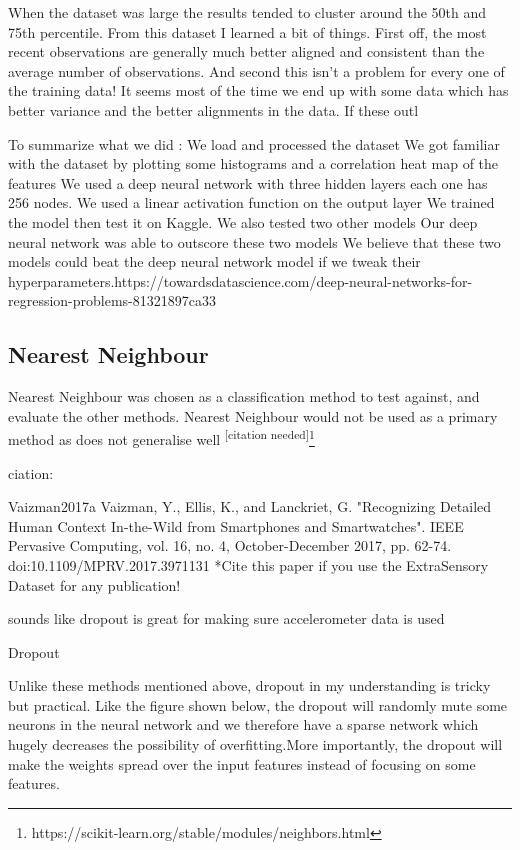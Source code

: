 \documentclass{UoNMCHA}
\newcommand{\citationneeded}{\textsuperscript{\color{blue} [citation needed]}}
\numberwithin{equation}{section}
\begin{document}
When the dataset was large the results tended to cluster around the 50th and 75th percentile. From this dataset I learned a bit of things. First off, the most recent observations are generally much better aligned and consistent than the average number of observations. And second this isn't a problem for every one of the training data! It seems most of the time we end up with some data which has better variance and the better alignments in the data. If these outl





To summarize what we did :
We load and processed the dataset
We got familiar with the dataset by plotting some histograms and a correlation heat map of the features
We used a deep neural network with three hidden layers each one has 256 nodes.
We used a linear activation function on the output layer
We trained the model then test it on Kaggle.
We also tested two other models
Our deep neural network was able to outscore these two models
We believe that these two models could beat the deep neural network model if we tweak their hyperparameters.https://towardsdatascience.com/deep-neural-networks-for-regression-problems-81321897ca33


\subsection{Nearest Neighbour}
Nearest Neighbour was chosen as a classification method to test against, and evaluate the other methods. Nearest Neighbour would not be used as a primary method as does not generalise well\citationneeded \footnote{https://scikit-learn.org/stable/modules/neighbors.html}



ciation:

Vaizman2017a	
Vaizman, Y., Ellis, K., and Lanckriet, G. "Recognizing Detailed Human Context In-the-Wild from Smartphones and Smartwatches". IEEE Pervasive Computing, vol. 16, no. 4, October-December 2017, pp. 62-74. doi:10.1109/MPRV.2017.3971131
*Cite this paper if you use the ExtraSensory Dataset for any publication!




sounds like dropout is great for making sure accelerometer data is used

Dropout

Unlike these methods mentioned above, dropout in my understanding is tricky but practical. Like the figure shown below, the dropout will randomly mute some neurons in the neural network and we therefore have a sparse network which hugely decreases the possibility of overfitting.More importantly, the dropout will make the weights spread over the input features instead of focusing on some features.
\end{document}
